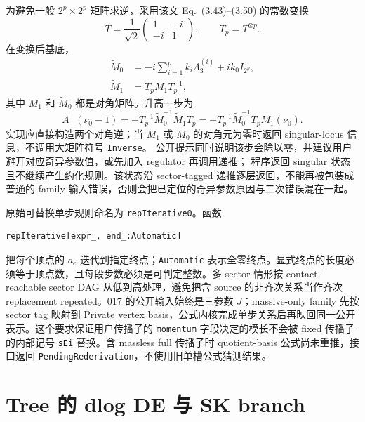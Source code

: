 ﻿\documentclass[a4paper,11pt]{article}
\begin{document}
为避免一般 $2^p\times2^p$ 矩阵求逆，采用该文 Eq.~(3.43)--(3.50) 的常数变换
\begin{equation}
 T=\frac1{\sqrt2}\begin{pmatrix}1&-i\\-i&1\end{pmatrix},
 \qquad T_p=T^{\otimes p}.
\end{equation}
在变换后基底，
\begin{align}
 \widetilde M_0
 &=-i\sum_{i=1}^{p}k_i\Lambda_3^{(i)}+ik_0I_{2^p},\\
 \widetilde M_1&=T_pM_1T_p^{-1},
\end{align}
其中 $M_1$ 和 $\widetilde M_0$ 都是对角矩阵。升高一步为
\begin{equation}
 A_+(\nu_0-1)
 =-T_p^{-1}\widetilde M_0^{-1}\widetilde M_1T_p
 =-T_p^{-1}\widetilde M_0^{-1}T_pM_1(\nu_0).
 \label{eq:tree-aplus}
\end{equation}
实现应直接构造两个对角逆；当 $M_1$ 或 $\widetilde M_0$ 的对角元为零时返回 singular-locus 信息，不调用大矩阵符号 \texttt{Inverse}。
公开提示同时说明该步会除以零，并建议用户避开对应奇异参数值，或先加入 regulator 再调用递推；
程序返回 singular 状态且不继续产生约化规则。该状态沿 sector-tagged 递推逐层返回，不能再被包装成
普通的 family 输入错误，否则会把已定位的奇异参数原因与二次错误混在一起。

原始可替换单步规则命名为 \texttt{repIterative0}。函数
\begin{verbatim}
repIterative[expr_, end_:Automatic]
\end{verbatim}
把每个顶点的 $a_e$ 迭代到指定终点；\texttt{Automatic} 表示全零终点。显式终点的长度必须等于顶点数，且每段步数必须是可判定整数。多 sector 情形按 contact-reachable sector DAG 从低到高处理，避免把含 source 的非齐次关系当作齐次 replacement repeated。017 的公开输入始终是三参数 $J$；massive-only family 先按 sector tag 映射到 Private vertex basis，公式内核完成单步关系后再映回同一公开表示。这个要求保证用户传播子的 \texttt{momentum} 字段决定的模长不会被 fixed 传播子的内部记号 \texttt{sEi} 替换。含 massless full 传播子时 quotient-basis 公式尚未重推，接口返回 \texttt{PendingRederivation}，不使用旧单槽公式猜测结果。

\section{Tree 的 dlog DE 与 SK branch}
\end{document}
